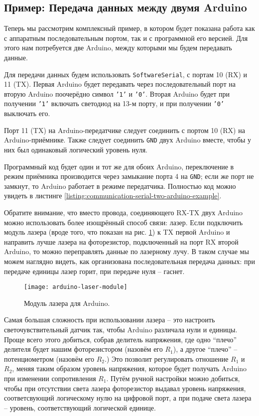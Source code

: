 \documentclass[../sparc.tex]{subfiles}
\begin{document}
\subsection{Пример: Передача данных между двумя Arduino}

Теперь мы рассмотрим комплексный пример, в котором будет показана работа как с
аппаратным последовательным портом, так и с программной его версией.  Для этого
нам потребуется две Arduino, между которыми мы будем передавать данные.

Для передачи данных будем использовать \texttt{SoftwareSerial}, с портам 10 (RX)
и 11 (TX).  Первая Arduino будет передавать через последовательный порт на
вторую Arduino поочерёдно символ \texttt{'1'} и \texttt{'0'}.  Вторая Arduino
будет при получении \texttt{'1'} включать светодиод на 13-м порту, и при
получении \texttt{'0'} выключать его.

Порт 11 (TX) на Arduino-передатчике следует соединить с портом 10 (RX) на
Arduino-приёмнике.  Также следует соединить \texttt{GND} двух Arduino вместе,
чтобы у них был одинаковый логический уровень нуля.

Программный код будет один и тот же для обоих Arduino, переключение в режим
приёмника производится через замыкание порта 4 на \texttt{GND}; если же порт не
замкнут, то Arduino работает в режиме передатчика.  Полностью код можно увидеть
в листинге \ref{listing:communication-serial-two-arduino-example}.

Обратите внимание, что вместо провода, соединяющего RX-TX двух Arduino можно
использовать более изощрённый способ связи: лазер.  Если подключить модуль
лазера (вроде того, что показан на рис. \ref{fig:arduino-laser-module}) к TX
первой Arduino и направить лучше лазера на фоторезистор, подключенный на порт RX
второй Arduino, то можно переправлять данные по лазерному лучу.  В таком случае
мы можем наглядно видеть, как организована последовательная передача данных: при
передаче единицы лазер горит, при передаче нуля -- гаснет.

\begin{figure}[ht]
  \centering
  \texttt{[image: arduino-laser-module]}
  \caption{Модуль лазера для Arduino.}
  \label{fig:arduino-laser-module}
\end{figure}


Самая большая сложность при использовании лазера -- это настроить
светочувствительный датчик так, чтобы Arduino различала нули и единицы.  Проще
всего этого добиться, собрав делитель напряжения, где одно ``плечо'' делителя
будет нашим фоторезистором (назовём его $R_1$), а другое ``плечо'' --
потенциометром (назовём его $R_2$.)  Это позволит регулировать отношение $R_1$ и
$R_2$, меняя таким образом уровень напряжения, которое будет получать Arduino
при изменении сопротивления $R_1$.  Путём ручной настройки можно добиться, чтобы
при отсутствии света лазера фоторезистор выдавал уровень напряжения,
соответсвующий логическому нулю на цифровой порт, а при подаче света лазера --
уровень, соответствующий логической единице.
\end{document}
